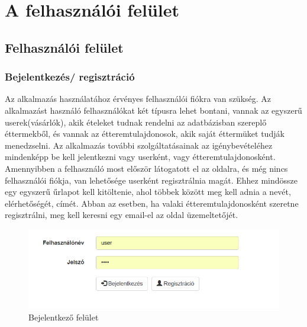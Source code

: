 \chapter{A felhasználói felület}



\section{Felhasználói felület}

\subsection{Bejelentkezés/ regisztráció}

Az alkalmazás használatához érvényes felhasználói fiókra van szükség. Az alkalmazást használó felhasználókat két típusra lehet bontani, vannak az egyszerű userek(vásárlók), akik ételeket tudnak rendelni az adatbázisban szereplő éttermekből, és vannak az étteremtulajdonosok, akik saját éttermüket tudják menedzselni. Az alkalmazás további szolgáltatásainak az igénybevételéhez mindenképp be kell jelentkezni vagy userként, vagy étteremtulajdonosként. Amennyibben a felhasználó most először látogatott el az oldalra, és még nincs felhasználói fiókja, van lehetősége userként regisztrálnia magát. Ehhez mindössze egy egyszerű űrlapot kell kitöltenie, ahol többek között meg kell adnia a nevét, elérhetőségét, címét. Abban az esetben, ha valaki étteremtulajdonosként szeretne regisztrálni, meg kell keresni egy email-el az oldal üzemeltetőjét.

\begin{figure}
\centering
\includegraphics[scale=0.8]{kepek/login.png}
\caption{Bejelentkező felület}
\label{fig:architecture}
\end{figure}

